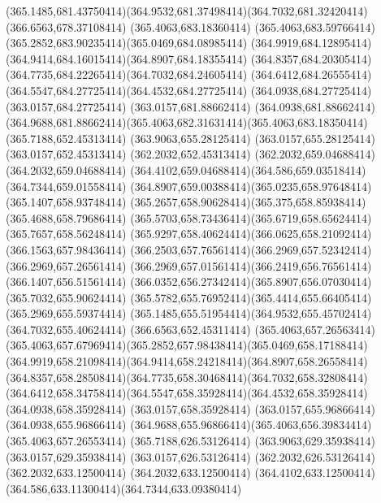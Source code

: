 {{	\curveto(365.1485,681.43750414)(364.9532,681.37498414)(364.7032,681.32420414)
	\lineto(366.6563,678.37108414)
	\closepath
	\moveto(365.4063,683.18360414)
	\curveto(365.4063,683.59766414)(365.2852,683.90235414)(365.0469,684.08985414)
	\curveto(364.9919,684.12895414)(364.9414,684.16015414)(364.8907,684.18355414)
	\curveto(364.8357,684.20305414)(364.7735,684.22265414)(364.7032,684.24605414)
	\curveto(364.6412,684.26555414)(364.5547,684.27725414)(364.4532,684.27725414)
	\lineto(364.0938,684.27725414)
	\lineto(363.0157,684.27725414)
	\lineto(363.0157,681.88662414)
	\lineto(364.0938,681.88662414)
	\curveto(364.9688,681.88662414)(365.4063,682.31631414)(365.4063,683.18350414)
	\closepath
	\moveto(365.7188,652.45313414)
	\lineto(363.9063,655.28125414)
	\lineto(363.0157,655.28125414)
	\lineto(363.0157,652.45313414)
	\lineto(362.2032,652.45313414)
	\lineto(362.2032,659.04688414)
	\lineto(364.2032,659.04688414)
	\curveto(364.4102,659.04688414)(364.586,659.03518414)(364.7344,659.01558414)
	\curveto(364.8907,659.00388414)(365.0235,658.97648414)(365.1407,658.93748414)
	\curveto(365.2657,658.90628414)(365.375,658.85938414)(365.4688,658.79686414)
	\curveto(365.5703,658.73436414)(365.6719,658.65624414)(365.7657,658.56248414)
	\curveto(365.9297,658.40624414)(366.0625,658.21092414)(366.1563,657.98436414)
	\curveto(366.2503,657.76561414)(366.2969,657.52342414)(366.2969,657.26561414)
	\curveto(366.2969,657.01561414)(366.2419,656.76561414)(366.1407,656.51561414)
	\curveto(366.0352,656.27342414)(365.8907,656.07030414)(365.7032,655.90624414)
	\curveto(365.5782,655.76952414)(365.4414,655.66405414)(365.2969,655.59374414)
	\curveto(365.1485,655.51954414)(364.9532,655.45702414)(364.7032,655.40624414)
	\lineto(366.6563,652.45311414)
	\closepath
	\moveto(365.4063,657.26563414)
	\curveto(365.4063,657.67969414)(365.2852,657.98438414)(365.0469,658.17188414)
	\curveto(364.9919,658.21098414)(364.9414,658.24218414)(364.8907,658.26558414)
	\curveto(364.8357,658.28508414)(364.7735,658.30468414)(364.7032,658.32808414)
	\curveto(364.6412,658.34758414)(364.5547,658.35928414)(364.4532,658.35928414)
	\lineto(364.0938,658.35928414)
	\lineto(363.0157,658.35928414)
	\lineto(363.0157,655.96866414)
	\lineto(364.0938,655.96866414)
	\curveto(364.9688,655.96866414)(365.4063,656.39834414)(365.4063,657.26553414)
	\closepath
	\moveto(365.7188,626.53126414)
	\lineto(363.9063,629.35938414)
	\lineto(363.0157,629.35938414)
	\lineto(363.0157,626.53126414)
	\lineto(362.2032,626.53126414)
	\lineto(362.2032,633.12500414)
	\lineto(364.2032,633.12500414)
	\curveto(364.4102,633.12500414)(364.586,633.11300414)(364.7344,633.09380414)
}}
